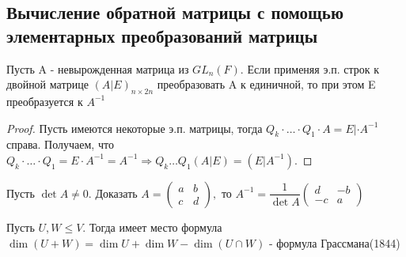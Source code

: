 \subsection{Вычисление обратной матрицы с помощью элементарных преобразований матрицы}
\begin{proposition}
	Пусть A - невырожденная матрица из \(GL_{n}(F)\). Если применяя э.п. строк к двойной матрице \((A|E)_{n\times 2n}\) преобразовать A к единичной, то при этом E преобразуется к \(A^{-1}\) 
\end{proposition}
\begin{proof}
	Пусть имеются некоторые э.п. матрицы, тогда \(Q_k\cdot\ldots\cdot Q_1\cdot A = E | \cdot A^{-1}\) справа. Получаем, что \(Q_k\cdot\ldots\cdot Q_1 = E\cdot A^{-1} = A^{-1}\Longrightarrow Q_k\ldots Q_1(A|E) = (E| A^{-1})\).
\end{proof}
\begin{proposition}
	Пусть \(\det A\ne 0\). Доказать \(A = \begin{pmatrix}
		a & b \\ c & d
	\end{pmatrix},\) то \(A^{-1} = \dfrac{1}{\det A}\begin{pmatrix}
	d & - b \\ -c & a
	\end{pmatrix}\)
\end{proposition}
\begin{theorem}
	Пусть \(U, W\le V\). Тогда имеет место формула \(\dim (U+W) = \dim U + \dim W - \dim(U\cap W)\) - формула Грассмана(1844)
\end{theorem}
